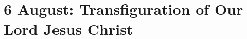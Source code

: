 {
\section{6 August: Transfiguration of Our Lord Jesus Christ}
\subtitle{ Class}
\subtitle{I \& II Vespers}
\medskip

\def\definevesperspropers{
  \def\premagverses{\vspace{-0.5\baselineskip}}
}
\def\definevesperspropersalt{
  \def\premagverses{\vspace{-0.5\baselineskip}}
}
\def\vesperspropersnote{At II Vespers:}
\def\vesperspropersaltnote{At I Vespers:}
\def\postmagtitle{\vspace{-0.5\baselineskip}}

\def\begincollectcols{\begin{parcolumns}[rulebetween,colwidths={1=0.44\linewidth}]{2}}
\smallskip
\benedicamusdomino[2]{}
}